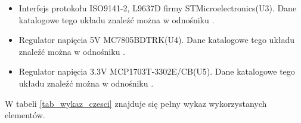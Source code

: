 \documentclass[12pt, twoside]{article} %
\numberwithin{equation}{subsection}
\numberwithin{figure}{section}
\numberwithin{table}{section}
\begin{document}
\begin{itemize}
{		}		
	
	\item{Interfejs protokołu ISO9141-2, L9637D firmy STMicroelectronics(U3). Dane katalogowe tego układu znaleźć można w odnośniku \cite{L9637D}.}
	\item{Regulator napięcia 5V MC7805BDTRK(U4). Dane katalogowe tego układu znaleźć można w odnośniku \cite{MC7805}.}
	
	\item{Regulator napięcia 3.3V MCP1703T-3302E/CB(U5). Dane katalogowe tego układu znaleźć można w odnośniku \cite{MCP17}.}
	
	\end{itemize}	
	
	\newpage
	
	W tabeli \ref{tab_wykaz_czesci} znajduje się pełny wykaz wykorzystanych elementów.
	
\end{document}
